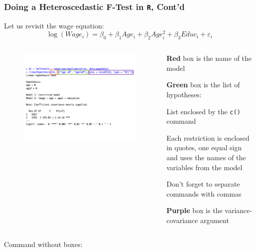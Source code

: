 \begin{frame}[fragile]\frametitle{Doing a Heteroscedastic F-Test in \texttt{R}, Cont'd}
	Let us revisit the wage equation:
	\[
		\log(Wage_i) = \beta_0 + \beta_1 Age_i + \beta_2 Age_i^2 + \beta_3 Educ_i + \varepsilon_i
	\]
\begin{columns}
\begin{column}{0.45\textwidth}
\vspace{-14mm}
\begin{figure}[htp]
\flushleft
	\includegraphics[width = 1.05\textwidth]{testingMultipleRestrictionsExample.pdf}	
\end{figure}

\end{column}
\begin{column}{0.55\textwidth}
\begin{itemize}{\footnotesize
	\item {\bf \color{red} Red} box is the name of the model
	\item {\bf \color{green} Green} box is the list of hypotheses:
				\begin{itemize}{\scriptsize 
					\item List enclosed by the \texttt{c()} command
					\item Each restriction is enclosed in quotes, one equal sign and uses the names of the variables from the model
					\item Don't forget to separate commands with commas}
				\end{itemize}
				
	\item {\bf \color{purple} Purple} box is the variance-covariance argument}
\end{itemize}

\end{column}

\end{columns}
\vspace{3mm}
{\scriptsize
Command without boxes:
}
	
\end{frame}




